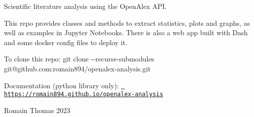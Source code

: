 \label{index_md_README}%
%
 Scientific literature analysis using the Open\+Alex API.

This repo provides classes and methods to extract statistics, plots and graphs, as well as examples in Jupyter Notebooks. There is also a web app built with Dash and some docker config files to deploy it.

To clone this repo\+: {\ttfamily git clone -\/-\/recurse-\/submodules git@github.\+com\+:romain894/openalex-\/analysis.\+git}

Documentation (python library only)\+: \href{https://romain894.github.io/openalex-analysis}{\texttt{ https\+://romain894.\+github.\+io/openalex-\/analysis}}

Romain Thomas 2023 